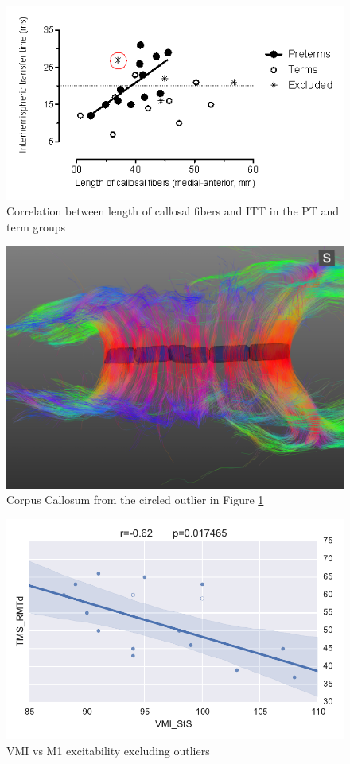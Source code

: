 \documentclass{frontiersHLTH}
\begin{document}
\begin{figure}
	\centering
		\includegraphics[width=\linewidth]{cyril_plot}
	\caption{Correlation between length of callosal fibers and ITT in the PT and term groups}
	\label{fig_cyril_1}
\end{figure}

\begin{figure}
	\centering
		\includegraphics[width=\linewidth]{cc_cyril}
	\caption{Corpus Callosum from the circled outlier in Figure \ref{fig_cyril_1}}
	\label{fig_cyril_2}
\end{figure}


\begin{figure}
	\centering
		\includegraphics[width=0.9\linewidth]{cyricl_corr_1}
	\caption{VMI vs M1 excitability excluding outliers}
	\label{fig_cyril_4}
\end{figure}
\end{document}
